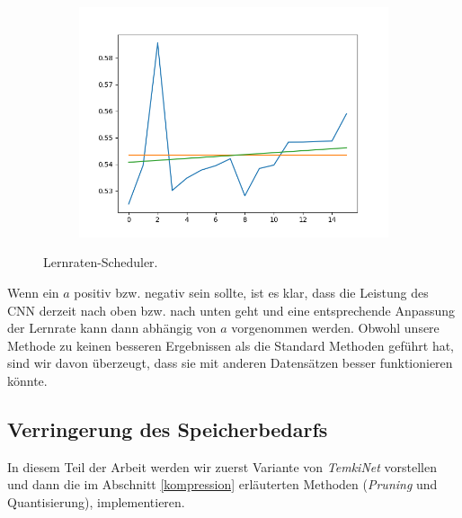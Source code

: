 \documentclass[12pt,a4paper]{scrartcl}
\numberwithin{equation}{section}
\begin{document}
\begin{figure}[h!]
\begin{subfigure}{.3\textwidth}
		\includegraphics[width=\textwidth]{lr_schedu_Falsch}
		\caption{}
		\label{fig:Lernrate_schedulerc}
	\end{subfigure}
	\caption{Lernraten-Scheduler.}
	\label{fig:Lernrate_scheduler}
\end{figure}

Wenn ein $ a $ positiv bzw. negativ sein sollte, ist es klar, dass die Leistung des CNN derzeit nach oben bzw. nach unten geht und eine entsprechende Anpassung der Lernrate kann dann abhängig von $ a $ vorgenommen werden. Obwohl  unsere Methode zu keinen besseren Ergebnissen als die Standard Methoden geführt hat, sind wir davon überzeugt, dass sie mit anderen Datensätzen besser funktionieren könnte.

\subsection{Verringerung  des Speicherbedarfs }\label{Exp:Speicher}
In diesem Teil der Arbeit werden wir zuerst Variante von \textit{TemkiNet} vorstellen und dann  die im Abschnitt \ref{kompression} erläuterten Methoden (\textit{Pruning} und Quantisierung), implementieren.
\end{document}
